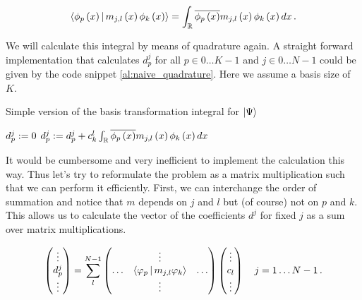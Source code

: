 \begin{equation}
  \Braket{\phi_p\left(x\right) | m_{j,l}\left(x\right) \phi_k\left(x\right)} = \int_\mathbb{R} \overline{\phi_p\left(x\right)} m_{j,l}\left(x\right) \phi_k\left(x\right) dx \,.
\end{equation}

We will calculate this integral by means of quadrature again. A straight forward
implementation that calculates $d_p^j$ for all $p \in 0 \ldots K-1$ and $j \in 0 \ldots N-1$
could be given by the code snippet \eqref{al:naive_quadrature}. Here we assume a
basis size of $K$.

\begin{algorithm}
\caption{Simple version of the basis transformation integral for $\Ket{\Psi}$}
\label{al:naive_quadrature}
\begin{algorithmic}
      \STATE $d_p^j := 0$
          \STATE $d_p^j := d_p^j + c_k^l \int_\mathbb{R} \overline{\phi_p\left(x\right)} m_{j,l}\left(x\right) \phi_k\left(x\right) dx$
        \ENDFOR
      \ENDFOR
    \ENDFOR
  \ENDFOR
\end{algorithmic}
\end{algorithm}

It would be cumbersome and very inefficient to implement the calculation this way.
Thus let's try to reformulate the problem as a matrix multiplication such that we
can perform it efficiently. First, we can interchange the order of summation and
notice that $m$ depends on $j$ and $l$ but (of course) not on $p$ and $k$. This
allows us to calculate the vector of the coefficients $d^j$ for fixed $j$ as a sum
over matrix multiplications.

\begin{equation}
  \begin{pmatrix}
    \vdots \\
    d_p^j \\
    \vdots
  \end{pmatrix}
  = \sum_l^{N-1}
  \begin{pmatrix}
    {}     & \vdots & {} \\
    \hdots & \Braket{\varphi_p|m_{j,l} \varphi_k} & \hdots \\
    {}     & \vdots & {} \\
  \end{pmatrix}
  \begin{pmatrix}
    \vdots \\
    c_l \\
    \vdots
  \end{pmatrix}
  \quad j = 1 \ldots N-1 \,.
\end{equation}

